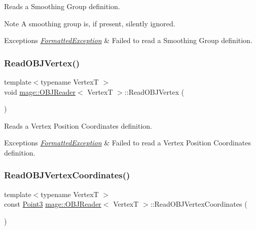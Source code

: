 Reads a Smoothing Group definition.

\begin{DoxyNote}{Note}
A smoothing group is, if present, silently ignored. 
\end{DoxyNote}

\begin{DoxyExceptions}{Exceptions}
{\em \hyperlink{classmage_1_1_formatted_exception}{Formatted\+Exception}} & Failed to read a Smoothing Group definition. \\
\hline
\end{DoxyExceptions}
\hypertarget{classmage_1_1_o_b_j_reader_a70fc61d8cc14dc8efbd73a88188cc511}{}\label{classmage_1_1_o_b_j_reader_a70fc61d8cc14dc8efbd73a88188cc511} 
\subsubsection{\texorpdfstring{Read\+O\+B\+J\+Vertex()}{ReadOBJVertex()}}
{\footnotesize\ttfamily template$<$typename VertexT $>$ \\
void \hyperlink{classmage_1_1_o_b_j_reader}{mage\+::\+O\+B\+J\+Reader}$<$ VertexT $>$\+::Read\+O\+B\+J\+Vertex (\begin{DoxyParamCaption}{ }\end{DoxyParamCaption})\hspace{0.3cm}{\ttfamily [private]}}

Reads a Vertex Position Coordinates definition.


\begin{DoxyExceptions}{Exceptions}
{\em \hyperlink{classmage_1_1_formatted_exception}{Formatted\+Exception}} & Failed to read a Vertex Position Coordinates definition. \\
\hline
\end{DoxyExceptions}
\hypertarget{classmage_1_1_o_b_j_reader_ace593a436953e8583b5b4cd721893c44}{}\label{classmage_1_1_o_b_j_reader_ace593a436953e8583b5b4cd721893c44} 
\subsubsection{\texorpdfstring{Read\+O\+B\+J\+Vertex\+Coordinates()}{ReadOBJVertexCoordinates()}}
{\footnotesize\ttfamily template$<$typename VertexT $>$ \\
const \hyperlink{structmage_1_1_point3}{Point3} \hyperlink{classmage_1_1_o_b_j_reader}{mage\+::\+O\+B\+J\+Reader}$<$ VertexT $>$\+::Read\+O\+B\+J\+Vertex\+Coordinates (\begin{DoxyParamCaption}{ }\end{DoxyParamCaption})\hspace{0.3cm}{\ttfamily [private]}}


